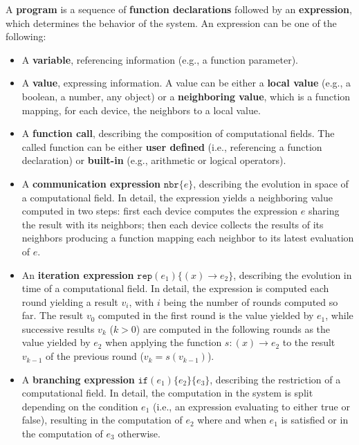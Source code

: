 A \textbf{program} is a sequence of \textbf{function declarations} followed by
an \textbf{expression}, which determines the behavior of the system. An
expression can be one of the following:
\begin{itemize}
  \item A \textbf{variable}, referencing information (e.g., a function
        parameter).
  \item A \textbf{value}, expressing information. A value can be either a
        \textbf{local value} (e.g., a boolean, a number, any object) or a
        \textbf{neighboring value}, which is a function mapping, for each
        device, the neighbors to a local value.
  \item A \textbf{function call}, describing the composition of computational
        fields. The called function can be either \textbf{user defined} (i.e.,
        referencing a function declaration) or \textbf{built-in} (e.g.,
        arithmetic or logical operators).
  \item A \textbf{communication expression} $\texttt{nbr}\{e\}$, describing the
        evolution in space of a computational field. In detail, the expression
        yields a neighboring value computed in two steps: first each device
        computes the expression $e$ sharing the result with its neighbors; then
        each device collects the results of its neighbors producing a function
        mapping each neighbor to its latest evaluation of $e$.

        

  \item An \textbf{iteration expression} $\texttt{rep}(e_1)\{(x) \rightarrow
        e_2 \}$, describing the evolution in time of a computational field. In
        detail, the expression is computed each round yielding a result $v_i$,
        with $i$ being the number of rounds computed so far. The result $v_0$
        computed in the first round is the value yielded by $e_1$, while
        successive results $v_k$ ($k > 0$) are computed in the following rounds
        as the value yielded by $e_2$ when applying the function $s: (x)
        \rightarrow e_2$ to the result $v_{k-1}$ of the previous round ($v_k =
        s(v_{k-1})$).
  \item A \textbf{branching expression} $\texttt{if}(e_1)\{e_2\}\{e_3\}$,
        describing the restriction of a computational field. In detail, the
        computation in the system is split depending on the condition $e_1$
        (i.e., an expression evaluating to either true or false), resulting in
        the computation of ${e_2}$ where and when $e_1$ is satisfied or in the
        computation of $e_3$ otherwise.


\end{itemize}
